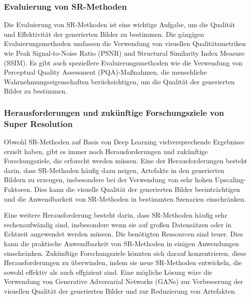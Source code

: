     \subsubsection{Evaluierung von SR-Methoden}
    
        Die Evaluierung von SR-Methoden ist eine wichtige Aufgabe, um die Qualität und Effektivität der generierten Bilder zu bestimmen.      
        Die gängigen Evaluierungsmethoden umfassen die Verwendung von visuellen Qualitätsmetriken wie Peak Signal-to-Noise Ratio (PSNR) und Structural Similarity Index Measure (SSIM).
        Es gibt auch speziellere Evaluierungsmethoden wie die Verwendung von Perceptual Quality Assessment (PQA)-Maßnahmen, die menschliche Wahrnehmungseigenschaften berücksichtigen, um die Qualität der generierten Bilder zu bestimmen.
    
    \subsubsection{Herausforderungen und zukünftige Forschungsziele von Super Resolution}
    
        Obwohl SR-Methoden auf Basis von Deep Learning vielversprechende Ergebnisse erzielt haben, gibt es immer noch Herausforderungen und zukünftige Forschungsziele, die erforscht werden müssen.
        Eine der Herausforderungen besteht darin, dass SR-Methoden häufig dazu neigen, Artefakte in den generierten Bildern zu erzeugen, insbesondere bei der Verwendung von sehr hohen Upscaling-Faktoren.      %
        Dies kann die visuelle Qualität der generierten Bilder beeinträchtigen und die Anwendbarkeit von SR-Methoden in bestimmten Szenarien einschränken.
        
        Eine weitere Herausforderung besteht darin, dass SR-Methoden häufig sehr rechenaufwändig sind, insbesondere wenn sie auf großen Datensätzen oder in Echtzeit angewendet werden müssen.      
        Die benötigten Ressourcen sind teuer.
        Dies kann die praktische Anwendbarkeit von SR-Methoden in einigen Anwendungen einschränken.        
        Zukünftige Forschungsziele könnten sich darauf konzentrieren, diese Herausforderungen zu überwinden, indem sie neue SR-Methoden entwickeln, die sowohl effektiv als auch effgizient sind.      
        Eine mögliche Lösung wäre die Verwendung von Generative Adversarial Networks (GANs) zur Verbesserung der visuellen Qualität der generierten Bilder und zur Reduzierung von Artefakten.      %
        
